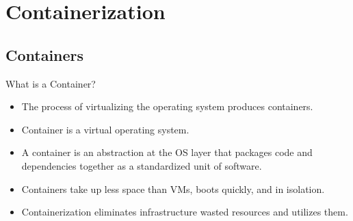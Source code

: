 

\section{Containerization}\label{sec:containerization}

\subsection{Containers}\label{subsec:containers}
\begin{frame}{What is a Container?}
    \begin{itemize}[<+- | alert@+>]
        \item The process of virtualizing the operating system produces containers.
        \item Container is a virtual operating system.
        \item A container is an abstraction at the OS layer that packages code and dependencies together as a standardized unit of software.
        \item Containers take up less space than VMs, boots quickly, and in isolation.
        \item Containerization eliminates infrastructure wasted resources and utilizes them.
    \end{itemize}
\end{frame}

